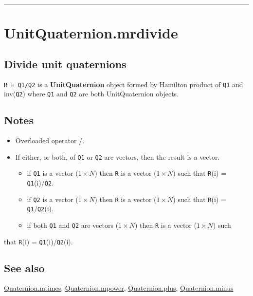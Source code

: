 \vspace{1.5ex}\hrule

\hypertarget{UnitQuaternion.mrdivide}{\section*{UnitQuaternion.mrdivide}}
\subsection*{Divide unit quaternions}


\texttt{R = Q1/Q2} is a \textbf{\color{red} UnitQuaternion} object formed by Hamilton product of \texttt{Q1} and
inv(\texttt{Q2}) where \texttt{Q1} and \texttt{Q2} are both UnitQuaternion objects.


\subsection*{Notes}
\begin{itemize}
  \item Overloaded operator \textquotesingle /\textquotesingle .
  \item If either, or both, of \texttt{Q1} or \texttt{Q2} are vectors, then the result is a vector.
\begin{itemize}
  \item if \texttt{Q1} is a vector ($1 \times N$) then \texttt{R} is a vector ($1 \times N$) such that \texttt{R}(i) = \texttt{Q1}(i)/\texttt{Q2}.
  \item if \texttt{Q2} is a vector ($1 \times N$) then \texttt{R} is a vector ($1 \times N$) such that \texttt{R}(i) = \texttt{Q1}/\texttt{Q2}(i).
  \item if both \texttt{Q1} and \texttt{Q2} are vectors ($1 \times N$) then \texttt{R} is a vector ($1 \times N$) such
\end{itemize}
\end{itemize}


that \texttt{R}(i) = \texttt{Q1}(i)/\texttt{Q2}(i).


\subsection*{See also}


\hyperlink{Quaternion.mtimes}{\color{blue} Quaternion.mtimes}, \hyperlink{Quaternion.mpower}{\color{blue} Quaternion.mpower}, \hyperlink{Quaternion.plus}{\color{blue} Quaternion.plus}, \hyperlink{Quaternion.minus}{\color{blue} Quaternion.minus}

